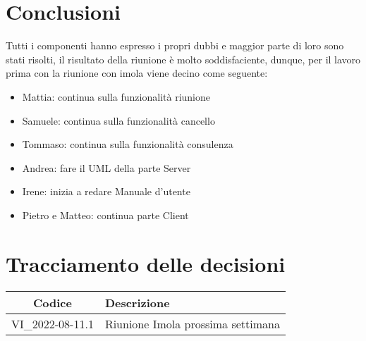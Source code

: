 \section{Conclusioni}
	Tutti i componenti hanno espresso i propri dubbi e maggior parte di loro sono stati risolti, il risultato della riunione è molto soddisfaciente, dunque, per il lavoro prima con la riunione con imola viene decino come seguente:
	\begin{itemize}
	\item Mattia: continua sulla funzionalità riunione
	\item Samuele: continua sulla funzionalità cancello
	\item Tommaso: continua sulla funzionalità consulenza
	\item Andrea: fare il UML della parte Server
	\item Irene: inizia a redare Manuale d'utente
	\item Pietro e Matteo: continua parte Client
	\end{itemize}

\newpage

\section*{Tracciamento delle decisioni}
	\renewcommand{\arraystretch}{1.8} %
	\begin{tabular}{ |c|l| }
		\hline
		\textbf{Codice} & \textbf{Descrizione} \\
		\hline
		VI\_2022-08-11.1 & Riunione Imola prossima settimana\\ %
		\hline
	\end{tabular}